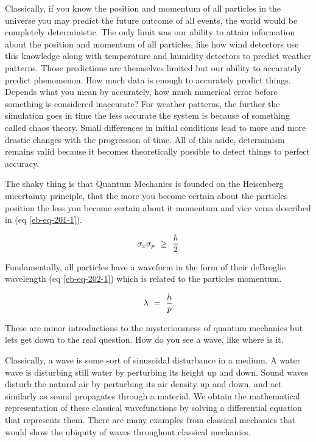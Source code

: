 \documentclass{article}
\begin{document}
Classically, if you know the position and momentum of all particles in the universe you may predict the future outcome of all events, the world would be completely deterministic. The only limit was our ability to attain information about the position and momentum of all particles, like how wind detectors use this knowledge along with temperature and humidity detectors to predict weather patterns. Those predictions are themselves limited but our ability to accurately predict phenomenon. How much data is enough to accurately predict things. Depends what you mean by accurately, how much numerical error before something is considered inaccurate? For weather patterns, the further the simulation goes in time the less accurate the system is because of something called chaos theory. Small differences in initial conditions lead to more and more drastic changes with the progression of time. All of this aside, determinism remains valid because it becomes theoretically possible to detect things to perfect accuracy.

The shaky thing is that Quantum Mechanics is founded on the Heisenberg uncertainty principle, that the more you become certain about the particles position the less you become certain about it momentum and vice versa described in (eq \ref{eb-eq-201-1}).

\begin{equation} \label{eb-eq-201-1}
\sigma_{x}\sigma_{p} \hspace{0.125cm} \geq \hspace{0.125cm} \frac{\hbar}{2}
\end{equation}

Fundamentally, all particles have a waveform in the form of their deBroglie wavelength (eq \ref{eb-eq-202-1}) which is related to the particles momentum. 

\begin{equation} \label{eb-eq-202-1}
\lambda \hspace{0.125cm} = \hspace{0.125cm} \frac{h}{p}
\end{equation}

These are minor introductions to the mysteriousness of quantum mechanics but lets get down to the real question. How do you see a wave, like where is it. 

Classically, a wave is some sort of sinusoidal disturbance in a medium. A water wave is disturbing still water by perturbing its height up and down. Sound waves disturb the natural air by perturbing its air density up and down, and act similarly as sound propagates through a material. We obtain the mathematical representation of these classical wavefunctions by solving a differential equation that represents them. There are many examples from classical mechanics that would show the ubiquity of waves throughout classical mechanics.
\end{document}
